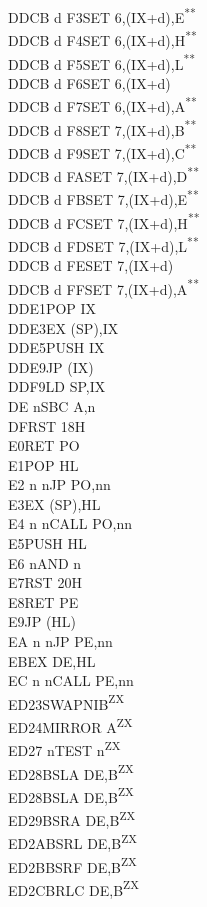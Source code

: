 \documentclass[12pt,twoside,openright,a4paper]{book}
\newcommand{\UNDOC}{\textnormal{\textsuperscript{**}}}
\newcommand{\ZXN}{\textnormal{\textsuperscript{ZX}}}
\begin{document}
\begin{multicols}{3}
{\begin{tabbing}
	DDCB d F3\>SET 6,(IX+d),E\UNDOC\\
	DDCB d F4\>SET 6,(IX+d),H\UNDOC\\
	DDCB d F5\>SET 6,(IX+d),L\UNDOC\\
	DDCB d F6\>SET 6,(IX+d)\\
	DDCB d F7\>SET 6,(IX+d),A\UNDOC\\
	DDCB d F8\>SET 7,(IX+d),B\UNDOC\\
	DDCB d F9\>SET 7,(IX+d),C\UNDOC\\
	DDCB d FA\>SET 7,(IX+d),D\UNDOC\\
	DDCB d FB\>SET 7,(IX+d),E\UNDOC\\
	DDCB d FC\>SET 7,(IX+d),H\UNDOC\\
	DDCB d FD\>SET 7,(IX+d),L\UNDOC\\
	DDCB d FE\>SET 7,(IX+d)\\
	DDCB d FF\>SET 7,(IX+d),A\UNDOC\\
	DDE1\>POP IX\\
	DDE3\>EX (SP),IX\\
	DDE5\>PUSH IX\\
	DDE9\>JP (IX)\\
	DDF9\>LD SP,IX\\
	DE n\>SBC A,n\\
	DF\>RST 18H\\
	E0\>RET PO\\
	E1\>POP HL\\
	E2 n n\>JP PO,nn\\
	E3\>EX (SP),HL\\
	E4 n n\>CALL PO,nn\\
	E5\>PUSH HL\\
	E6 n\>AND n\\
	E7\>RST 20H\\
	E8\>RET PE\\
	E9\>JP (HL)\\
	EA n n\>JP PE,nn\\
	EB\>EX DE,HL\\
	EC n n\>CALL PE,nn\\
	ED23\>SWAPNIB\ZXN\\
	ED24\>MIRROR A\ZXN\\
	ED27 n\>TEST n\ZXN\\
	ED28\>BSLA DE,B\ZXN\\
	ED28\>BSLA DE,B\ZXN\\
	ED29\>BSRA DE,B\ZXN\\
	ED2A\>BSRL DE,B\ZXN\\
	ED2B\>BSRF DE,B\ZXN\\
	ED2C\>BRLC DE,B\ZXN\\

\end{tabbing}}
\end{multicols}
\end{document}
